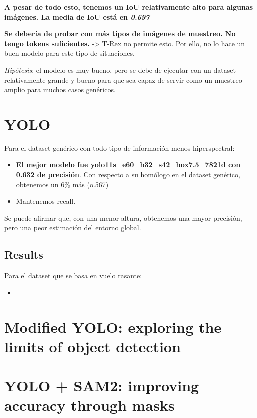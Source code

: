 \documentclass[12pt]{report} %
\begin{document}
\textbf{A pesar de todo esto, tenemos un IoU relativamente alto para algunas imágenes. La media de IoU está en \textit{0.697}}

\textbf{Se debería de probar con más tipos de imágenes de muestreo. No tengo tokens suficientes.} -> T-Rex no permite esto. Por ello, no lo hace un buen modelo para este tipo de situaciones.

\textit{Hipótesis}: el modelo es muy bueno, pero se debe de ejecutar con un dataset relativamente grande y bueno para que sea capaz de servir como un muestreo amplio para muchos casos genéricos. 

\section{YOLO}

Para el dataset genérico con todo tipo de información menos hiperspectral:

\begin{itemize}
	\item \textbf{El mejor modelo fue yolo11s\_e60\_b32\_s42\_box7.5\_7821d con 0.632 de precisión}. Con respecto a su homólogo en el dataset genérico, obtenemos un 6\% más (o.567)
	\item Mantenemos recall.
\end{itemize}

Se puede afirmar que, con una menor altura, obtenemos una mayor precisión, pero una peor estimación del entorno global.

\subsection{Results}

Para el dataset que se basa en vuelo rasante:

\begin{itemize}
	\item 
\end{itemize}


\section{Modified YOLO: exploring the limits of object detection}

\section{YOLO + SAM2: improving accuracy through masks}


\clearpage
{}

\printbibliography




\end{document}
